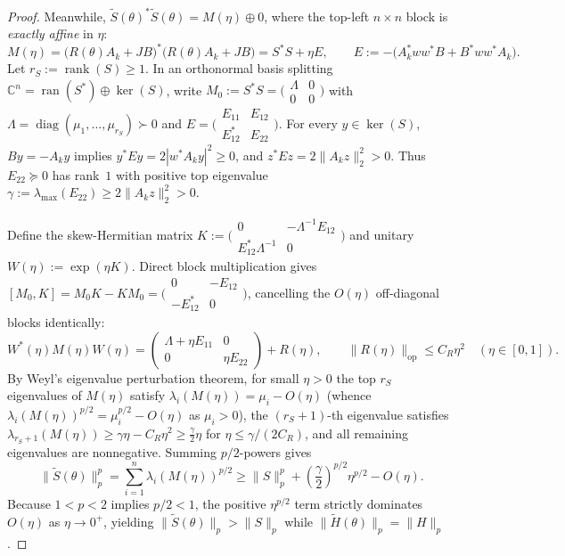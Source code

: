 \documentclass[10pt,letterpaper]{article}
\newcommand{\C}{\mathbb{C}}
\newcommand{\ran}{\operatorname{ran}}
\newcommand{\rank}{\operatorname{rank}}
\newcommand{\diag}{\operatorname{diag}}
\newcommand{\op}{\mathrm{op}}
\begin{document}
\begin{proof}
Meanwhile, $\widetilde{S}(\theta)^* \widetilde{S}(\theta) = M(\eta) \oplus 0$, where the top-left $n\times n$ block is \emph{exactly affine} in $\eta$:
\[
  M(\eta) = \bigl(R(\theta) A_k + JB\bigr)^*\bigl(R(\theta) A_k + JB\bigr) = S^* S + \eta E,
  \qquad E := -\bigl(A_k^* w w^* B + B^* w w^* A_k\bigr).
\]
Let $r_S := \rank(S) \ge 1$. In an orthonormal basis splitting $\C^n = \ran(S^*) \oplus \ker(S)$, write $M_0 := S^* S = \bigl(\begin{smallmatrix} \Lambda & 0 \\ 0 & 0 \end{smallmatrix}\bigr)$ with $\Lambda = \diag(\mu_1,\dots,\mu_{r_S}) \succ 0$ and $E = \bigl(\begin{smallmatrix} E_{11} & E_{12} \\ E_{12}^* & E_{22} \end{smallmatrix}\bigr)$. For every $y \in \ker(S)$, $By = -A_k y$ implies $y^* E y = 2|w^* A_k y|^2 \ge 0$, and $z^* E z = 2\|A_k z\|_2^2 > 0$. Thus $E_{22} \succeq 0$ has rank~$1$ with positive top eigenvalue $\gamma := \lambda_{\max}(E_{22}) \ge 2\|A_k z\|_2^2 > 0$.

Define the skew-Hermitian matrix $K := \bigl(\begin{smallmatrix} 0 & -\Lambda^{-1} E_{12} \\ E_{12}^* \Lambda^{-1} & 0 \end{smallmatrix}\bigr)$ and unitary $W(\eta) := \exp(\eta K)$. Direct block multiplication gives $[M_0, K] = M_0 K - K M_0 = \bigl(\begin{smallmatrix} 0 & -E_{12} \\ -E_{12}^* & 0 \end{smallmatrix}\bigr)$, cancelling the $O(\eta)$ off-diagonal blocks identically:
\[
  W^*(\eta) M(\eta) W(\eta) = \begin{pmatrix} \Lambda + \eta E_{11} & 0 \\ 0 & \eta E_{22} \end{pmatrix} + R(\eta),
  \qquad \|R(\eta)\|_{\op} \le C_R \eta^2 \quad (\eta \in [0,1]).
\]
By Weyl's eigenvalue perturbation theorem, for small $\eta > 0$ the top $r_S$ eigenvalues of $M(\eta)$ satisfy $\lambda_i(M(\eta)) = \mu_i - O(\eta)$ (whence $\lambda_i(M(\eta))^{p/2} = \mu_i^{p/2} - O(\eta)$ as $\mu_i > 0$), the $(r_S + 1)$-th eigenvalue satisfies $\lambda_{r_S + 1}(M(\eta)) \ge \gamma\eta - C_R\eta^2 \ge \frac{\gamma}{2}\eta$ for $\eta \le \gamma/(2C_R)$, and all remaining eigenvalues are nonnegative. Summing $p/2$-powers gives
\[
  \|\widetilde{S}(\theta)\|_p^p = \sum_{i=1}^n \lambda_i(M(\eta))^{p/2} \ge \|S\|_p^p + \left(\frac{\gamma}{2}\right)^{p/2}\eta^{p/2} - O(\eta).
\]
Because $1 < p < 2$ implies $p/2 < 1$, the positive $\eta^{p/2}$ term strictly dominates $O(\eta)$ as $\eta \to 0^+$, yielding $\|\widetilde{S}(\theta)\|_p > \|S\|_p$ while $\|\widetilde{H}(\theta)\|_p = \|H\|_p$.
\end{proof}
\end{document}
